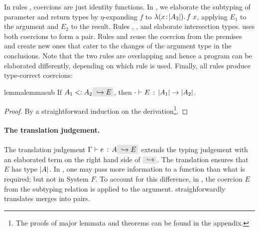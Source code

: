 In rules , coercions are just
identity functions. In , we elaborate the subtyping of
parameter and return types by $\eta$-expanding $f$ to $\lambda (x \!:\! \lvert A_3 \rvert).\, f \; x$, applying $E_1$ to the argument and $E_2$ to the result. Rules
, , and
 elaborate intersection types.
 uses both coercions to form a pair. Rules
 and  reuse the coercion
from the premises and create new ones that cater to the changes of the argument
type in the conclusions. Note that the two rules are overlapping and
hence a program can be elaborated differently, depending on which rule
is used. Finally, all rules produce type-correct coercions:



\begin{restatable}{lemma}{lemmasub}
  \label{lemma:sub}
  If $ A_1 \subtype A_2 \yields E $, then $ \cdot \vdash E \ \!:\! \ \lvert A_1 \rvert \to \lvert A_2 \rvert $.
\end{restatable}

\begin{proof}
  By a straightforward induction on the derivation\footnote{The proofs of major lemmata and theorems can be found in the appendix.}.
\end{proof}

\paragraph{The translation judgement.} The translation judgement $\jtype \Gamma e
A \yields E$ extends the typing judgement with an elaborated term on the right
hand side of $\yields {}$. The translation ensures that $E$ has type $\lvert A \rvert$. In
\name, one may pass more information to a function than what is required; but
not in System $F$. To account for this difference, in , the
coercion $E$ from the subtyping relation is applied to the argument.
 straighforwardly translates merges into pairs.

